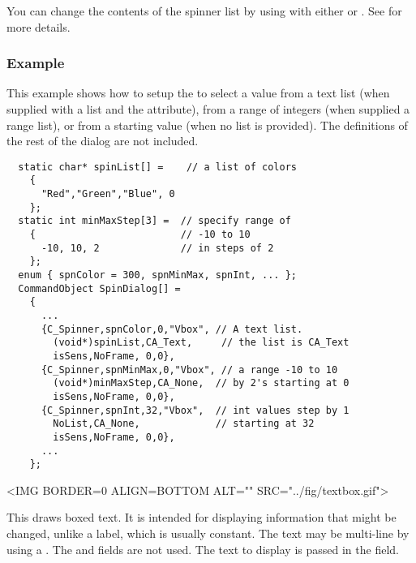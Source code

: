 You can change the contents of the spinner list by using 
 with either   or
. See  for more
details.

\subsubsection* {Example}

This example shows how to setup the  to select
a value from a text list (when supplied with a list and the
 attribute), from a range of integers (when
supplied a range list), or from a starting value (when no list is
provided). The definitions of the rest of the dialog are not
included. 

\footnotesize
\begin{verbatim}
  static char* spinList[] =    // a list of colors
    {
      "Red","Green","Blue", 0
    };
  static int minMaxStep[3] =  // specify range of
    {                         // -10 to 10
      -10, 10, 2              // in steps of 2
    };
  enum { spnColor = 300, spnMinMax, spnInt, ... };
  CommandObject SpinDialog[] =
    {
      ...
      {C_Spinner,spnColor,0,"Vbox", // A text list.
        (void*)spinList,CA_Text,     // the list is CA_Text
        isSens,NoFrame, 0,0},
      {C_Spinner,spnMinMax,0,"Vbox", // a range -10 to 10
        (void*)minMaxStep,CA_None,  // by 2's starting at 0
        isSens,NoFrame, 0,0},
      {C_Spinner,spnInt,32,"Vbox",  // int values step by 1
        NoList,CA_None,             // starting at 32
        isSens,NoFrame, 0,0},
      ...
    };

\end{verbatim}
\normalfont\normalsize


\small
\begin{rawhtml}
<IMG BORDER=0 ALIGN=BOTTOM ALT="" SRC="../fig/textbox.gif">
\end{rawhtml}
\begin{latexonly}

\end{latexonly}
\normalfont\normalsize
\vspace{.1in}

This draws boxed text. It is intended for displaying information
that might be changed, unlike a label, which is usually constant.
The text may be multi-line by using a . The
 and  fields are not used. The text to
display is passed in the  field.

